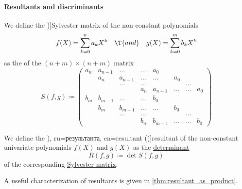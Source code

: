 \paragraph{Resultants and discriminants}

\begin{definition}\label{def:sylvester_matrix}
  We define the \term[ru=матрица Сильвестра, en=Sylvester's matrix (\cite[exercise 4.6.1.12]{Knuth1997ArtVol2})]{Sylvester matrix} of the non-constant polynomials
  \begin{align*}
    f(X) = \sum_{k=0}^n a_k X^k
    &&\T{and}&&
    g(X) = \sum_{k=0}^m b_k X^k
  \end{align*}
  as the  of the \( (n + m) \times (n + m) \) matrix
  \begin{equation*}
    S(f, g) \coloneqq
    \begin{pmatrix}
      a_n    & a_{n-1} & \ldots  & \ldots  & a_0     &        &        &        \\
             & a_n     & a_{n-1} & \ldots  & \ldots  & a_0    &        &        \\
             &         & \ldots  & \ldots  &         &        & \ldots &        \\
             &         &         & a_n     & a_{n-1} & \ldots & \ldots & a_0    \\
      b_m    & b_{m-1} & \ldots  & \ldots  & b_0     &        &        &        \\
             & b_m     & b_{m-1} & \ldots  & \ldots  & b_0    &        &        \\
             &         & \ldots  & \ldots  &         &        & \ldots &        \\
             &         &         & b_n     & b_{m-1} & \ldots & \ldots & b_0
    \end{pmatrix}
  \end{equation*}
\end{definition}

\begin{definition}\label{def:resultant}
  We define the \term[bg=резултанта (\cite[198]{Обрешков1962ВисшаАлгебра}), ru=результанта, en=resultant (\cite[674]{Knuth1997ArtVol2})]{resultant} of the non-constant univariate polynomials \( f(X) \) and \( g(X) \) as the \hyperref[def:matrix_determinant]{determinant}
  \begin{equation*}
    R(f, g) \coloneqq \det S(f, g)
  \end{equation*}
  of the corresponding \hyperref[def:sylvester_matrix]{Sylvester matrix}.
\end{definition}
\begin{comments}
  \item A useful characterization of resultants is given in \cref{thm:resultant_as_product}.
\end{comments}

